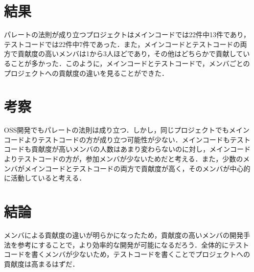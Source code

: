 \documentclass[uplatex,twocolumn,dvipdfmx]{jsarticle}
\begin{document}
\section{結果}

パレートの法則が成り立つプロジェクトはメインコードでは22件中13件であり，テストコードでは22件中7件であった．また，メインコードとテストコードの両方で貢献度の高いメンバは1から3人ほどであり，その他はどちらかで貢献していることが多かった．このように，メインコードとテストコードで，メンバごとのプロジェクトへの貢献度の違いを見ることができた．


\section{考察}

OSS開発でもパレートの法則は成り立つ．しかし，同じプロジェクトでもメインコードよりテストコードの方が成り立つ可能性が少ない．メインコードもテストコードも貢献度が高いメンバの人数はあまり変わらないのに対し，メインコードよりテストコードの方が，参加メンバが少ないためだと考える．また，少数のメンバがメインコードとテストコードの両方で貢献度が高く，そのメンバが中心的に活動していると考える．


\section{結論}

メンバによる貢献度の違いが明らかになったため，貢献度の高いメンバの開発手法を参考にすることで，より効率的な開発が可能になるだろう．全体的にテストコードを書くメンバが少ないため，テストコードを書くことでプロジェクトへの貢献度は高まるはずだ．



\end{document}
